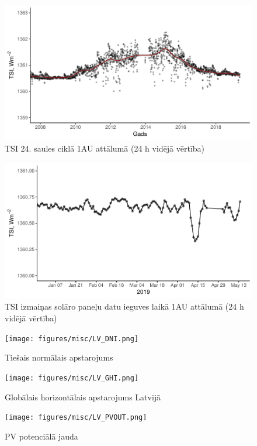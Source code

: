 \begin{figure}[h]
    \centering
    \includegraphics[width=\linewidth]{figures/misc/TSI_8-19.pdf}
    \caption{TSI 24. saules ciklā 1AU attālumā (24 h vidējā vērtība)\cite{TSIdata}}
    \label{fig:TSI1}
\end{figure}

\begin{figure}[h]
    \centering
    \includegraphics[width=\linewidth]{figures/misc/TSI.pdf}
    \caption{TSI izmaiņas solāro paneļu datu ieguves laikā 1AU attālumā (24 h vidējā vērtība)\cite{TSIdata}}
    \label{fig:TSI2}
\end{figure}

\begin{figure}[h]
    \centering
    \texttt{[image: figures/misc/LV\_DNI.png]}
    \caption{Tiešais normālais apstarojums \cite{solargis}}
    \label{fig:lv_DNI}
\end{figure}
\begin{figure}[h]
    \centering
    \texttt{[image: figures/misc/LV\_GHI.png]}
    \caption{Globālais horizontālais apstarojums Latvijā \cite{solargis}}
    \label{fig:lv_GHI}
\end{figure}
\begin{figure}[h]
    \centering
    \texttt{[image: figures/misc/LV\_PVOUT.png]}
    \caption{PV potenciālā jauda \cite{solargis}}
    \label{fig:lv_PVOUT}
\end{figure}
